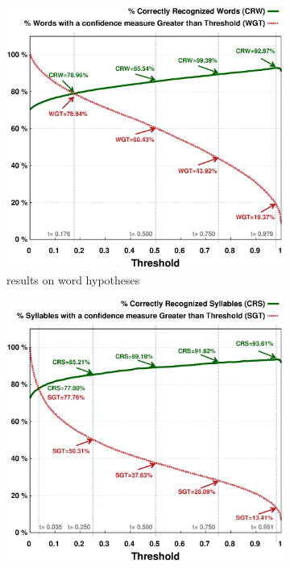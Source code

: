 \documentclass[a4paper]{article}
\begin{document}
\begin{figure}[t]
\centering
        \begin{subfigure}[b]{0.45\textwidth}
		\includegraphics[scale=0.40]{Image/ETAPE_combined_min50occ_words}
               	\caption{results on word hypotheses}
        \end{subfigure}
	\hspace{0.3cm}
	\begin{subfigure}[b]{0.45\textwidth}
		\includegraphics[scale=0.40]{Image/ETAPE_combined_min50occ_syllables}

\end{subfigure}
\end{figure}
\end{document}
